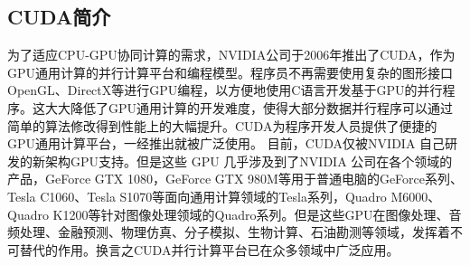 \subsection{CUDA简介}
为了适应CPU-GPU协同计算的需求，NVIDIA公司于2006年推出了CUDA，作为GPU通用计算的并行计算平台和编程模型。程序员不再需要使用复杂的图形接口OpenGL、DirectX等进行GPU编程，以方便地使用C语言开发基于GPU的并行程序。这大大降低了GPU通用计算的开发难度，使得大部分数据并行程序可以通过简单的算法修改得到性能上的大幅提升。CUDA为程序开发人员提供了便捷的GPU通用计算平台，一经推出就被广泛使用。
目前，CUDA仅被NVIDIA 自己研发的新架构GPU支持。但是这些 GPU 几乎涉及到了NVIDIA 公司在各个领域的产品，GeForce GTX 1080，GeForce GTX 980M等用于普通电脑的GeForce系列、Tesla C1060、Tesla S1070等面向通用计算领域的Tesla系列，Quadro M6000、Quadro K1200等针对图像处理领域的Quadro系列。但是这些GPU在图像处理、音频处理、金融预测、物理仿真、分子模拟、生物计算、石油勘测等领域，发挥着不可替代的作用。换言之CUDA并行计算平台已在众多领域中广泛应用。



